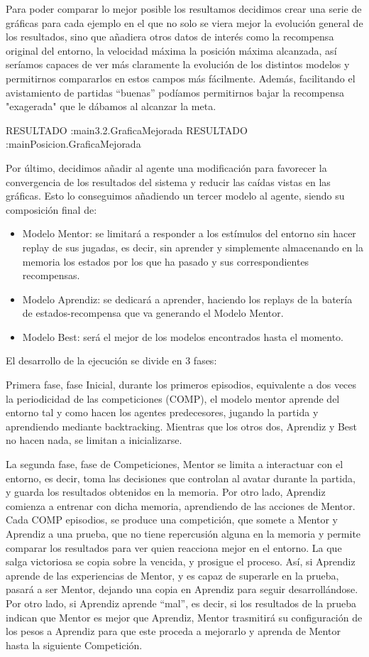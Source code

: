 Para poder comparar lo mejor posible los resultamos decidimos crear una serie de gráficas para cada ejemplo en el que no solo se viera mejor la evolución general de los resultados, sino que añadiera otros datos de interés como la recompensa original del entorno, la velocidad máxima la posición máxima alcanzada, así seríamos capaces de ver más claramente la evolución de los distintos modelos y permitirnos compararlos en estos campos más fácilmente.
Además, facilitando el avistamiento de partidas “buenas” podíamos permitirnos bajar la recompensa "exagerada" que le dábamos al alcanzar la meta.

RESULTADO :main3.2.GraficaMejorada
RESULTADO :mainPosicion.GraficaMejorada

Por último, decidimos añadir al agente una modificación para favorecer la convergencia de los resultados del sistema y reducir las caídas vistas en las gráficas.
Esto lo conseguimos añadiendo un tercer modelo al agente, siendo su composición final de:
\begin{itemize}
 \item Modelo Mentor: se limitará a responder a los estímulos del entorno sin hacer replay de sus jugadas, es decir, sin aprender y simplemente almacenando en la memoria los estados por los que ha pasado y sus correspondientes recompensas.
 \item Modelo Aprendiz: se dedicará a aprender, haciendo los replays de la batería de estados-recompensa que va generando el Modelo Mentor.
 \item Modelo Best: será el mejor de los modelos encontrados hasta el momento. 
\end{itemize}
El desarrollo de la ejecución se divide en 3 fases:

Primera fase, fase Inicial, durante los primeros episodios, equivalente a dos veces la periodicidad de las competiciones (COMP), el modelo mentor aprende del entorno tal y como hacen los agentes predecesores, jugando la partida y aprendiendo mediante backtracking. Mientras que los otros dos, Aprendiz y Best no hacen nada, se limitan a inicializarse.

La segunda fase, fase de Competiciones, Mentor se limita a interactuar con el entorno, es decir, toma las decisiones que controlan al avatar durante la partida, y guarda los resultados obtenidos en la memoria. Por otro lado, Aprendiz comienza a entrenar con dicha memoria, aprendiendo de las acciones de Mentor.
Cada COMP episodios, se produce una competición, que somete a Mentor y Aprendiz a una prueba, que no tiene repercusión alguna en la memoria y permite comparar los resultados para ver quien reacciona mejor en el entorno. La que salga victoriosa se copia sobre la vencida, y prosigue el proceso.
Así, si Aprendiz aprende de las experiencias de Mentor, y es capaz de superarle en la prueba, pasará a ser Mentor, dejando una copia en Aprendiz para seguir desarrollándose. Por otro lado, si Aprendiz aprende “mal”, es decir, si los resultados de la prueba indican que Mentor es mejor que Aprendiz, Mentor trasmitirá su configuración de los pesos a Aprendiz para que este proceda a mejorarlo y aprenda de Mentor hasta la siguiente Competición.  

